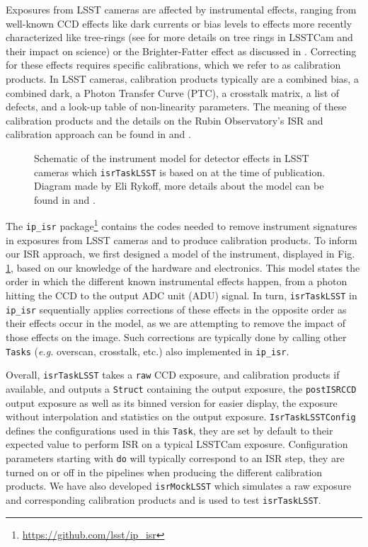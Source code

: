 Exposures from LSST cameras are affected by instrumental effects, ranging from well-known CCD effects like dark currents or bias levels to effects more recently characterized like tree-rings (see \citet{2017JInst..12C5015P,2020JATIS...6a1005P,2023PASP..135k5003E,2015JInst..10C8010O,2016ApJ...825...61O} for more details on tree rings in LSSTCam and their impact on science) or the Brighter-Fatter effect as discussed in \cite{2024PASP..136d5003B}.
Correcting for these effects requires specific calibrations, which we refer to as calibration products. In LSST cameras, calibration products typically are a combined bias, a combined dark, a Photon Transfer Curve (PTC), a crosstalk matrix, a list of defects, and a look-up table of non-linearity parameters.
The meaning of these calibration products and the details on the Rubin Observatory's ISR and calibration approach can be found in \citet{2024arXiv240414516P} and \citep{SITCOMTN-086}.
\begin{figure}
    \caption{Schematic of the instrument model for detector effects in LSST cameras which \texttt{isrTaskLSST} is based on at the time of publication. Diagram made by Eli Rykoff, more details about the model can be found in \citet{SITCOMTN-086} and \citet{ 2024arXiv240414516P}.}
    \label{fig:isr_model}
\end{figure}

The \texttt{ip\_isr} package\footnote{\url{https://github.com/lsst/ip_isr}} contains the codes needed to remove instrument signatures in exposures from LSST cameras and to produce calibration products.
To inform our ISR approach, we first designed a model of the instrument, displayed in Fig. \ref{fig:isr_model}, based on our knowledge of the hardware and electronics.
This model states the order in which the different known instrumental effects happen, from a photon hitting the CCD to the output ADC unit (ADU) signal.
In turn, \texttt{isrTaskLSST} in \texttt{ip\_isr} sequentially applies corrections of these effects in the opposite order as their effects occur in the model, as we are attempting to remove the impact of those effects on the image. Such corrections are typically done by calling other \texttt{Tasks} (\textit{e.g.} overscan, crosstalk, etc.) also implemented in \texttt{ip\_isr}.


Overall, \texttt{isrTaskLSST} takes a \texttt{raw} CCD exposure, and calibration products if available, and outputs a \texttt{Struct} containing the output exposure, the \texttt{postISRCCD} output exposure as well as its binned version for easier display, the exposure without interpolation and statistics on the output exposure.
\texttt{IsrTaskLSSTConfig} defines the configurations used in this \texttt{Task}, they are set by default to their expected value to perform ISR on a typical LSSTCam exposure. Configuration parameters starting with \texttt{do} will typically correspond to an ISR step, they are turned on or off in the pipelines when producing the different calibration products.
We have also developed \texttt{isrMockLSST} which simulates a raw exposure and corresponding calibration products and is used to test \texttt{isrTaskLSST}.



